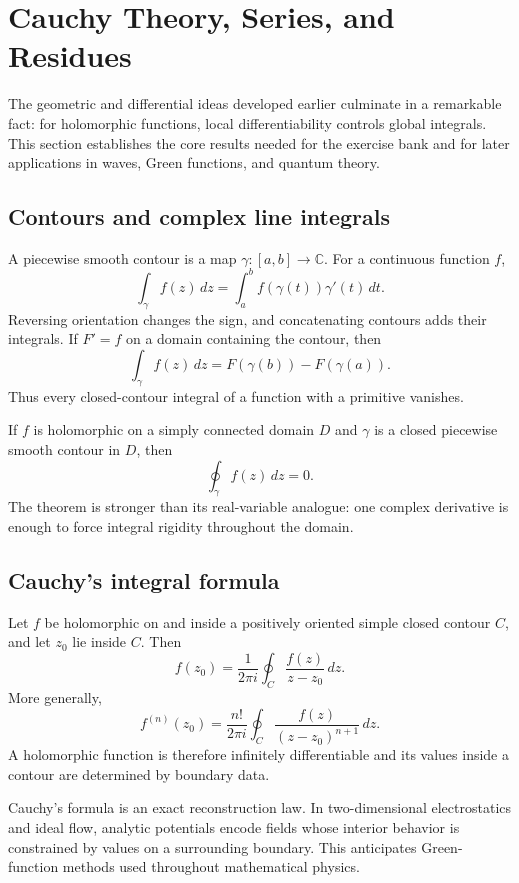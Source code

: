 \section{Cauchy Theory, Series, and Residues}
\label{sec:ch5-cauchy-residues}

The geometric and differential ideas developed earlier culminate in a remarkable fact: for holomorphic functions, local differentiability controls global integrals. This section establishes the core results needed for the exercise bank and for later applications in waves, Green functions, and quantum theory.

\subsection{Contours and complex line integrals}
A piecewise smooth contour is a map $\gamma:[a,b]\to\mathbb C$. For a continuous function $f$,
\[
\int_\gamma f(z)\,dz=\int_a^b f(\gamma(t))\gamma'(t)\,dt.
\]
Reversing orientation changes the sign, and concatenating contours adds their integrals. If $F'=f$ on a domain containing the contour, then
\[
\int_\gamma f(z)\,dz=F(\gamma(b))-F(\gamma(a)).
\]
Thus every closed-contour integral of a function with a primitive vanishes.

\begin{keyidea}
If $f$ is holomorphic on a simply connected domain $D$ and $\gamma$ is a closed piecewise smooth contour in $D$, then
\[
\oint_\gamma f(z)\,dz=0.
\]
The theorem is stronger than its real-variable analogue: one complex derivative is enough to force integral rigidity throughout the domain.
\end{keyidea}

\subsection{Cauchy's integral formula}
Let $f$ be holomorphic on and inside a positively oriented simple closed contour $C$, and let $z_0$ lie inside $C$. Then
\begin{equation}
\boxed{f(z_0)=\frac{1}{2\pi i}\oint_C\frac{f(z)}{z-z_0}\,dz.}
\label{eq:cauchy-integral-formula}
\end{equation}
More generally,
\[
f^{(n)}(z_0)=\frac{n!}{2\pi i}\oint_C\frac{f(z)}{(z-z_0)^{n+1}}\,dz.
\]
A holomorphic function is therefore infinitely differentiable and its values inside a contour are determined by boundary data.

\begin{physicalbox}
Cauchy's formula is an exact reconstruction law. In two-dimensional electrostatics and ideal flow, analytic potentials encode fields whose interior behavior is constrained by values on a surrounding boundary. This anticipates Green-function methods used throughout mathematical physics.
\end{physicalbox}

